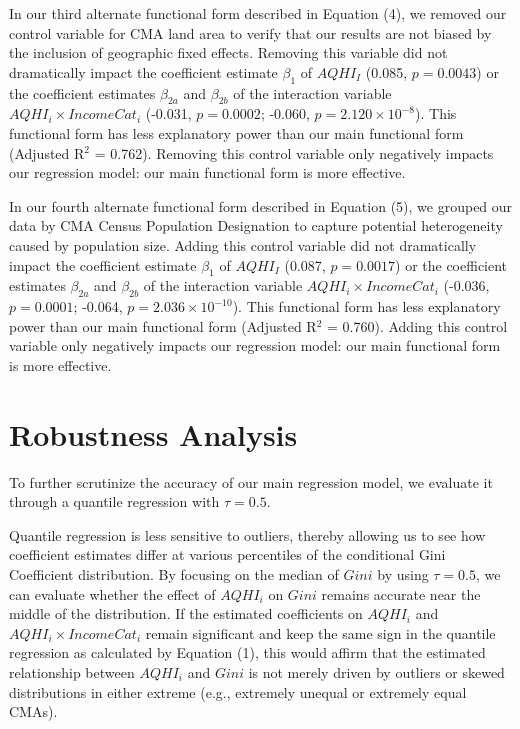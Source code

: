 \documentclass[AEJ]{AEA}
\begin{document}
In our third alternate functional form described in Equation (4), we removed our control
variable for CMA land area to verify that our results are not biased by the inclusion of
geographic fixed effects. Removing this variable did not dramatically impact the coefficient
estimate $\beta_1$ of $AQHI_I$ (0.085, $p=0.0043$) or the coefficient estimates
$\beta_{2a}$ and $\beta_{2b}$ of the interaction variable $AQHI_i \times IncomeCat_i$
(-0.031, $p = 0.0002$; -0.060, $p = 2.120\times 10^{-8}$). This functional form has
less explanatory power than our main functional form (Adjusted R$^2$ = 0.762). Removing this control
variable only negatively impacts our regression model: our main functional form is more effective.

In our fourth alternate functional form described in Equation (5), we grouped our data
by CMA Census Population Designation to capture potential heterogeneity caused by population size.
Adding this control variable did not dramatically impact the coefficient
estimate $\beta_1$ of $AQHI_I$ (0.087, $p=0.0017$) or the coefficient estimates
$\beta_{2a}$ and $\beta_{2b}$ of the interaction variable $AQHI_i \times IncomeCat_i$
(-0.036, $p = 0.0001$; -0.064, $p = 2.036\times 10^{-10}$). This functional form has
less explanatory power than our main functional form (Adjusted R$^2$ = 0.760). Adding this control
variable only negatively impacts our regression model: our main functional form is more effective.

\section{Robustness Analysis}

To further scrutinize the accuracy of our main regression model, we 
evaluate it through a quantile regression with $\tau=0.5$.

Quantile regression is less sensitive to outliers, thereby allowing us to see how coefficient
estimates differ at various percentiles of the conditional Gini Coefficient distribution. By 
focusing on the median of $Gini$ by using $\tau = 0.5$, we can evaluate whether the effect of $AQHI_i$
on $Gini$ remains accurate near the middle of the distribution. If the estimated coefficients on $AQHI_i$ 
and $AQHI_i \times IncomeCat_i$ remain significant and keep the same sign in the quantile regression
as calculated by Equation (1), this would affirm that the estimated relationship between
$AQHI_i$ and $Gini$ is not merely driven by outliers or skewed distributions in either 
extreme (e.g., extremely unequal or extremely equal CMAs).
\end{document}
